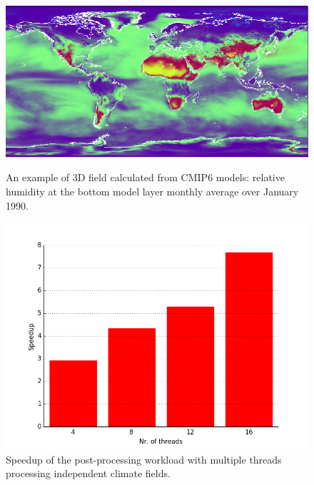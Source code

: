 \documentclass[procedia]{easychair}
\begin{document}
\begin{figure}[h]
\centering
\begin{minipage}[b]{.45\textwidth}
  \centering
   \vspace*{1.5cm}
 \includegraphics[width=1\textwidth]{hur.png}
 \caption{An example of 3D field calculated from CMIP6 models: relative 
humidity at the bottom model 
   layer monthly average over January 1990.}
\label{fig:hum}
\end{minipage}%
\hspace{0.6cm}
\begin{minipage}[b]{.45\textwidth}
  \centering
 \includegraphics[width=1\textwidth]{speedup_chart.png}
  \vspace*{-0.75cm}
 \caption{Speedup of the post-processing workload with multiple threads 
processing independent climate fields.}
\label{fig:speedup}
\end{minipage}
\end{figure}
\end{document}
